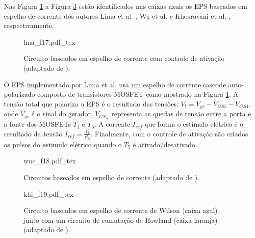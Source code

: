 Nas Figura \ref{fig:lma_f17} a Figura \ref{fig:khi_f19} estão identificados nas caixas azuis os EPS baseados em espelho de corrente dos autores Lima et al. \cite{DeLima2002AControl}, Wu et al. \cite{Wu2002AApplications} e Khosravani et al. \cite{KhosravaniSanaz2011DevelopingSystem}, respectivamente.

\begin{figure}[h]
    \centering %
    \small %
    \def\svgwidth{0.6
    \columnwidth}%
    {lma_f17.pdf_tex}
    \caption{Circuito baseados em espelho de corrente com controle de ativação (adaptado de \cite{DeLima2002AControl}).}
    \label{fig:lma_f17}
\end{figure}

O EPS implementado por Lima et al. \cite{DeLima2002AControl} usa um espelho de corrente cascode auto-polarizado composto de transistores MOSFET como mostrado na Figura \ref{fig:lma_f17}. A tensão total que polariza o \acrshort{EPS} é o resultado das tensões: $V_{t}= V_{gs} - V_{GS3} - V_{GS1}$, onde $V_{gs}$ é o sinal do gerador, $V_{GS_{X}}$ representa as quedas de tensão entre a porta e a fonte dos MOSFETs $T_{1}$ e $T_{3}$.  A corrente $I_{ref}$ que forma o estímulo elétrico é o resultado da tensão $I_{ref}  = \frac{V_{t}}{R_{5}}$. Finalmente, com o controle de ativação são criados os pulsos do estimulo elétrico quando o $T_{5}$ é ativado/desativado.

\begin{figure}
    \centering %
    \small %
    \def\svgwidth{0.7
    \columnwidth}%
    {wuc_f18.pdf_tex}
    \caption{Circuitos baseados em espelho de corrente (adaptado de \cite{Wu2002AApplications}).}
    \label{fig:wuc_f18}
\end{figure}

\begin{figure}
    \centering %
    \small %
    \def\svgwidth{1
    \columnwidth}%
    {khi_f19.pdf_tex}
    \caption{Circuito baseados em espelho de corrente de Wilson (caixa azul) junto com um circuito de comutação de Howland (caixa laranja) (adaptado de \cite{KhosravaniSanaz2011DevelopingSystem}).}
    \label{fig:khi_f19}
\end{figure}

